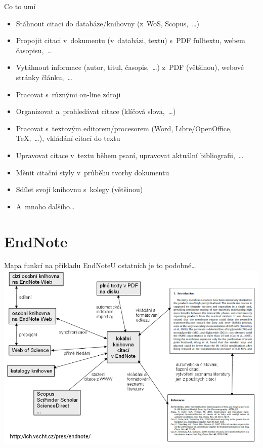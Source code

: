 \documentclass[compress, ucs, xelatex, xcolor=dvipsnames, print,
	hyperref={
		bookmarks=true,
		unicode=true,
		colorlinks=true,
		pdftitle={Citacni software},
		plainpages=false,
		pdfauthor={Vojtech Zeisek},
		pdfsubject={Kratky uvod do citacniho software},
		pdfcreator={XeLaTeX},
		pdfkeywords={citace, reference, software, literatura},
		linkcolor=Red,
		anchorcolor=Red,
		citecolor=Green,
		filecolor=Magenta,
		menucolor=Green,
		urlcolor=Cyan,
		pdftex},
	url={hyphens, lowtilde} %
	]{beamer}
\begin{document}
\begin{frame}{Co to umí}
	\begin{itemize}
		\item Stáhnout citaci do databáze/knihovny (z~WoS, Scopus,~\ldots)
		\item Propojit citaci v~dokumentu (v~databázi, textu) s~PDF fulltextu, webem časopisu,~\ldots
		\item Vytáhnout informace (autor, titul, časopis,~\ldots) z~PDF (většinou), webové stránky článku,~\ldots
		\item Pracovat s~různými on-line zdroji
		\item Organizovat a~prohledávat citace (klíčová slova,~\ldots)
		\item Pracovat s~textovým editorem/procesorem (\href{https://www.natur.cuni.cz/fakulta/cit/podpora-uzivatelu/softwarove-licence}{Word}, \href{https://www.openoffice.cz/}{Libre/OpenOffice}, \TeX,~\ldots), vkládání citací do textu
		\item Upravovat citace v~textu během psaní, upravovat aktuální bibliografii,~\ldots
		\item Měnit citační styly v~průběhu tvorby dokumentu
		\item Sdílet svojí knihovnu s~kolegy (většinou)
		\item A~mnoho dalšího\ldots
	\end{itemize}
\end{frame}

\section{EndNote}

\begin{frame}{Mapa funkcí na příkladu EndNote}{U ostatních je to podobné\ldots}
	\includegraphics[width=\textwidth]{mapa_funkci.png}
\end{frame}
\end{document}
